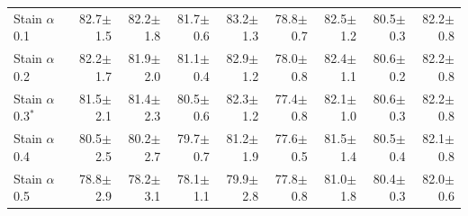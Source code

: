 \begin{table}[H]
\begin{tabular}{lrrrrrrrr}
\addlinespace
Stain $\alpha$ 0.1 & 82.7{\scriptsize$\pm$1.5} & 82.2{\scriptsize$\pm$1.8} & 81.7{\scriptsize$\pm$0.6} & 83.2{\scriptsize$\pm$1.3} & 78.8{\scriptsize$\pm$0.7} & 82.5{\scriptsize$\pm$1.2} & 80.5{\scriptsize$\pm$0.3} & 82.2{\scriptsize$\pm$0.8} \\
Stain $\alpha$ 0.2 & 82.2{\scriptsize$\pm$1.7} & 81.9{\scriptsize$\pm$2.0} & 81.1{\scriptsize$\pm$0.4} & 82.9{\scriptsize$\pm$1.2} & 78.0{\scriptsize$\pm$0.8} & 82.4{\scriptsize$\pm$1.1} & 80.6{\scriptsize$\pm$0.2} & 82.2{\scriptsize$\pm$0.8} \\
Stain $\alpha$ 0.3$^{*}$ & 81.5{\scriptsize$\pm$2.1} & 81.4{\scriptsize$\pm$2.3} & 80.5{\scriptsize$\pm$0.6} & 82.3{\scriptsize$\pm$1.2} & 77.4{\scriptsize$\pm$0.8} & 82.1{\scriptsize$\pm$1.0} & 80.6{\scriptsize$\pm$0.3} & 82.2{\scriptsize$\pm$0.8} \\
Stain $\alpha$ 0.4 & 80.5{\scriptsize$\pm$2.5} & 80.2{\scriptsize$\pm$2.7} & 79.7{\scriptsize$\pm$0.7} & 81.2{\scriptsize$\pm$1.9} & 77.6{\scriptsize$\pm$0.5} & 81.5{\scriptsize$\pm$1.4} & 80.5{\scriptsize$\pm$0.4} & 82.1{\scriptsize$\pm$0.8} \\
Stain $\alpha$ 0.5 & 78.8{\scriptsize$\pm$2.9} & 78.2{\scriptsize$\pm$3.1} & 78.1{\scriptsize$\pm$1.1} & 79.9{\scriptsize$\pm$2.8} & 77.8{\scriptsize$\pm$0.8} & 81.0{\scriptsize$\pm$1.8} & 80.4{\scriptsize$\pm$0.3} & 82.0{\scriptsize$\pm$0.6} \\
\bottomrule
\end{tabular}
\end{table}

